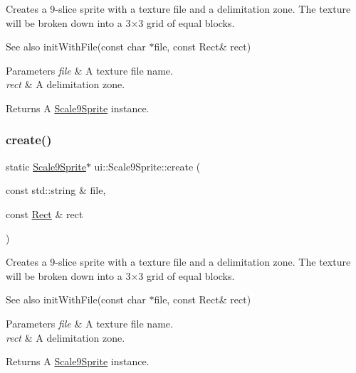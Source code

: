 Creates a 9-\/slice sprite with a texture file and a delimitation zone. The texture will be broken down into a 3×3 grid of equal blocks.

\begin{DoxySeeAlso}{See also}
init\+With\+File(const char $\ast$file, const Rect\& rect) 
\end{DoxySeeAlso}

\begin{DoxyParams}{Parameters}
{\em file} & A texture file name. \\
\hline
{\em rect} & A delimitation zone. \\
\hline
\end{DoxyParams}
\begin{DoxyReturn}{Returns}
A \hyperlink{classui_1_1Scale9Sprite}{Scale9\+Sprite} instance. 
\end{DoxyReturn}
\mbox{\label{classui_1_1Scale9Sprite_aecd4dcbafbdb68543b068b0a4259c1b0}} 
\subsubsection{\texorpdfstring{create()}{create()}\hspace{0.1cm}{\footnotesize\ttfamily [8/10]}}
{\footnotesize\ttfamily static \hyperlink{classui_1_1Scale9Sprite}{Scale9\+Sprite}$\ast$ ui\+::\+Scale9\+Sprite\+::create (\begin{DoxyParamCaption}\item[{const std\+::string \&}]{file,  }\item[{const \hyperlink{classRect}{Rect} \&}]{rect }\end{DoxyParamCaption})\hspace{0.3cm}{\ttfamily [static]}}

Creates a 9-\/slice sprite with a texture file and a delimitation zone. The texture will be broken down into a 3×3 grid of equal blocks.

\begin{DoxySeeAlso}{See also}
init\+With\+File(const char $\ast$file, const Rect\& rect) 
\end{DoxySeeAlso}

\begin{DoxyParams}{Parameters}
{\em file} & A texture file name. \\
\hline
{\em rect} & A delimitation zone. \\
\hline
\end{DoxyParams}
\begin{DoxyReturn}{Returns}
A \hyperlink{classui_1_1Scale9Sprite}{Scale9\+Sprite} instance. 
\end{DoxyReturn}
\mbox{\label{classui_1_1Scale9Sprite_ada47ed1da460627d81ec743cfdaefb6d}} 

